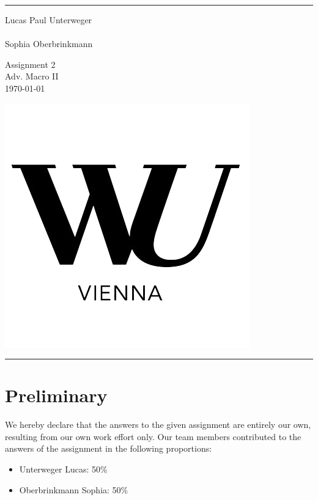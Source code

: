 \documentclass[a4paper,11pt]{article}
\begin{document}

\fancyhead[C]{}
\hrule  %
\begin{minipage}{0.295\textwidth} 
\raggedright
\footnotesize
Lucas Paul Unterweger \hfill\\   
\hfill\\
Sophia Oberbrinkmann
\end{minipage}
\begin{minipage}{0.4\textwidth} 
\centering 
\large 
Assignment 2\\ 
\normalsize 
Adv. Macro II\\ 
\today \\
\end{minipage}
\begin{minipage}{0.295\textwidth} 
\raggedleft
\includegraphics[scale=0.15]{style/wu_transparent.png}\\
\end{minipage}
\hrule 
\bigskip

\section{Preliminary}
We hereby declare that the answers to the given assignment are entirely our own, resulting from our own work effort only. Our team members contributed to the answers of the assignment in the following proportions: 
\begin{itemize}
	\renewcommand{\labelitemi}{$\Rightarrow$}
	\item Unterweger Lucas: 50\% 
	\item Oberbrinkmann Sophia: 50\%
\end{itemize}
\tableofcontents
\pagebreak
\listoffigures
\pagebreak
\end{document}
